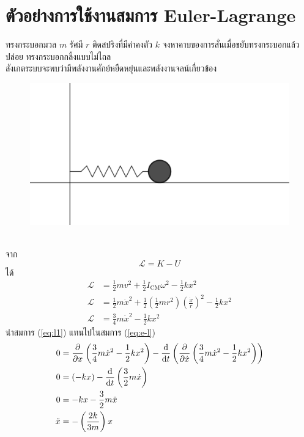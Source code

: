 \documentclass[a4paper,12pt]{article}
\begin{document}
\section{ตัวอย่างการใช้งานสมการ Euler-Lagrange}
ทรงกระบอกมวล \(m\) รัศมี \(r\) ติดสปริงที่มีค่าคงตัว \(k\) จงหาคาบของการสั่นเมื่อขยับทรงกระบอกแล้วปล่อย ทรงกระบอกกลิ้งแบบไม่ไถล\cite{morin}\\
สังเกตระบบจะพบว่ามีพลังงานศักย์หยืดหยุ่นและพลังงานจลน์เกี่ยวข้อง
\begin{figure}[h]
	\centering
	\includegraphics[width=0.4\linewidth]{cylinderrollwithspring}
	\label{fig:cylinderrollwithspring}
\end{figure}\\
จาก
\begin{equation}
	\mathcal{L}=K-U
\end{equation}
ได้
\begin{align}
	\mathcal{L} & =\frac{1}{2}mv^2+\frac{1}{2}I_{\text{CM}}\omega^2-\frac{1}{2}kx^2\nonumber                                                \\
	\mathcal{L} & =\frac{1}{2}m\dot{x}^2+\frac{1}{2}\left( \frac{1}{2}mr^2\right) \left(\frac{\dot{x}}{r}\right)^2-\frac{1}{2}kx^2\nonumber \\
	\mathcal{L} & =\frac{3}{4}m\dot{x}^2-\frac{1}{2}kx^2\label{eq:l1}
\end{align}
นำสมการ (\ref{eq:l1}) แทนไปในสมการ (\ref{eq:e-l})
\begin{align}
	0        & =\diffp*{\left( \frac{3}{4}m\dot{x}^2-\frac{1}{2}kx^2\right)}{x} -\diff*{\left(\diffp*{\left( \frac{3}{4}m\dot{x}^2-\frac{1}{2}kx^2\right) }{\dot{x}}\right)}{t}  \nonumber \\
	0        & =(-kx)-\diff*{\left(\frac{3}{2}m\dot{x}\right)}{t}                                                                                                   \nonumber              \\
	0        & =-kx-\frac{3}{2}m\ddot{x}                                                                                                                           \nonumber               \\
	\ddot{x} & =-\left( \frac{2k}{3m}\right) x\label{eq:newtonshm}
\end{align}
\end{document}
